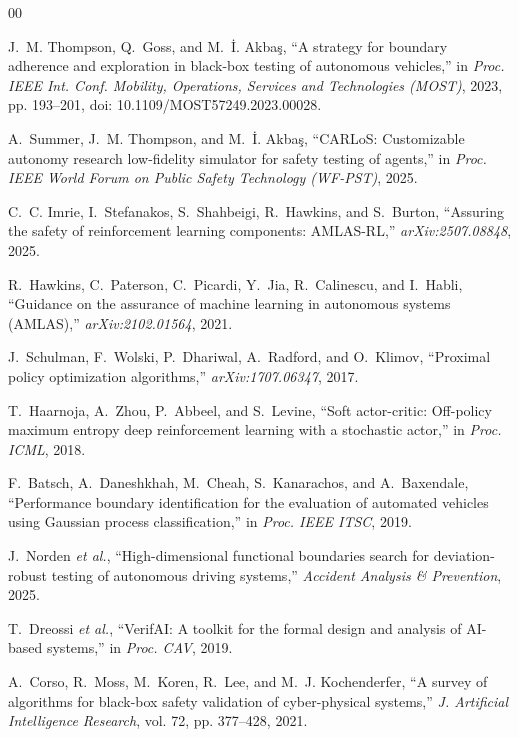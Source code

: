 \documentclass[conference]{IEEEtran}
\begin{document}
\begin{thebibliography}{00}

J.~M. Thompson, Q.~Goss, and M.~\.{I}. Akba\c{s}, ``A strategy for boundary
adherence and exploration in black-box testing of autonomous vehicles,'' in
\textit{Proc. IEEE Int. Conf. Mobility, Operations, Services and Technologies
(MOST)}, 2023, pp. 193--201, doi: 10.1109/MOST57249.2023.00028.

A.~Summer, J.~M. Thompson, and M.~\.{I}. Akba\c{s}, ``CARLoS: Customizable
autonomy research low-fidelity simulator for safety testing of agents,'' in
\textit{Proc. IEEE World Forum on Public Safety Technology (WF-PST)}, 2025.

C.~C. Imrie, I.~Stefanakos, S.~Shahbeigi, R.~Hawkins, and S.~Burton,
``Assuring the safety of reinforcement learning components: AMLAS-RL,''
\textit{arXiv:2507.08848}, 2025.

R.~Hawkins, C.~Paterson, C.~Picardi, Y.~Jia, R.~Calinescu, and I.~Habli,
``Guidance on the assurance of machine learning in autonomous systems
(AMLAS),'' \textit{arXiv:2102.01564}, 2021.

J.~Schulman, F.~Wolski, P.~Dhariwal, A.~Radford, and O.~Klimov, ``Proximal
policy optimization algorithms,'' \textit{arXiv:1707.06347}, 2017.

T.~Haarnoja, A.~Zhou, P.~Abbeel, and S.~Levine, ``Soft actor-critic:
Off-policy maximum entropy deep reinforcement learning with a stochastic
actor,'' in \textit{Proc. ICML}, 2018.

F.~Batsch, A.~Daneshkhah, M.~Cheah, S.~Kanarachos, and A.~Baxendale,
``Performance boundary identification for the evaluation of automated vehicles
using Gaussian process classification,'' in \textit{Proc. IEEE ITSC}, 2019.

J.~Norden \textit{et al.}, ``High-dimensional functional boundaries search
for deviation-robust testing of autonomous driving systems,''
\textit{Accident Analysis \& Prevention}, 2025.

T.~Dreossi \textit{et al.}, ``VerifAI: A toolkit for the formal design and
analysis of AI-based systems,'' in \textit{Proc. CAV}, 2019.

A.~Corso, R.~Moss, M.~Koren, R.~Lee, and M.~J. Kochenderfer, ``A survey of
algorithms for black-box safety validation of cyber-physical systems,''
\textit{J. Artificial Intelligence Research}, vol. 72, pp. 377--428, 2021.

\end{thebibliography}
\end{document}
